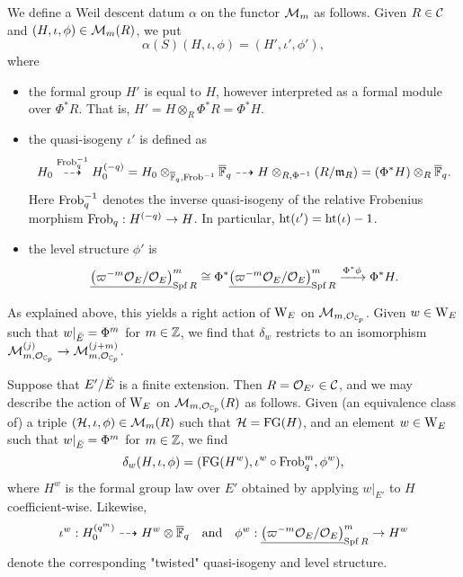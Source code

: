 \documentclass[../main.tex]{subfiles}
\begin{document}
We define a Weil descent datum $\alpha$ on the functor $\mathcal{M}_m$ as follows. 
Given $R\in \mathcal{C}$ and $(H, \iota, \phi) \in \mathcal{M}_m(R)$, we put
\begin{equation*}
  \alpha(S) \left( H, \iota, \phi \right) = (H', \iota',\phi'),
\end{equation*}
where
\begin{itemize}
  \item the formal group $H'$ is equal to $H$, however interpreted as a formal
    module over $\Phi^*R$. That is, $H' = H \otimes_{R} \Phi^* R = \Phi^* H$.
  \item the quasi-isogeny $\iota'$ is defined as
    \begin{equation*}
      H_0 \overset{\mathrm{Frob}_q^{-1}}{\dashrightarrow} H_0^{(-q)} = H_0
      \otimes_{\overline {\mathbb{F}}_q, \mathrm{Frob}^{-1}}
      \overline {\mathbb{F}}_q \dashrightarrow H \otimes_{R, \Phi^{-1}} (R/\mathfrak{m}_R) = (\Phi^*
      H) \otimes_R \overline {\mathbb{F}}_q.
    \end{equation*}
    Here $\mathrm{Frob}_q^{-1}$ denotes the inverse quasi-isogeny of the relative
    Frobenius morphism $\mathrm{Frob}_q: H^{(-q)} \to H$. In particular, 
    $\textnormal{ht}(\iota') = \textnormal{ht}(\iota)-1$.
  \item the level structure $\phi'$ is
    \begin{equation*}
      \underline{\left({\varpi^{-m}\mathcal{O}_E}/{\mathcal{O}_E} \right)}^m_{\operatorname{Spf} R}
      \cong \Phi^* \underline{\left({\varpi^{-m}\mathcal{O}_E}/{\mathcal{O}_E} \right)}^m_{\operatorname{Spf} R}
      \xrightarrow{\Phi^* \phi} \Phi^* H.
    \end{equation*}
\end{itemize}

As explained above, this yields a right action of $\mathrm W_E$ on $\mathcal{M}_{m, \mathcal{O}_{\mathbb{C}_p}}$.
Given $w \in \mathrm W_E$ such that $w|_{\breve {E}} = \Phi^m$ for $m \in \mathbb{Z}$, we find
that $\delta_w$ restricts to an isomorphism $\mathcal{M}_{m, \mathcal{O}_{\mathbb{C}_p}}^{(j)} \to \mathcal{M}_{m,
\mathcal{O}_{\mathbb{C}_p}}^{(j+m)}$. 

\begin{xpl}
  Suppose that $E'/{\breve {E}}$ is a finite extension. Then $R = \mathcal{O}_{E'} \in \mathcal{C}$, 
  and we may describe the action of $\mathrm W_E$ on 
  $\mathcal{M}_{m, \mathcal{O}_{\mathbb{C}_p}}(R)$ as follows. Given (an equivalence class of)
  a triple $(\mathcal{H}, \iota, \phi) \in \mathcal{M}_m(R)$ such that 
  $\mathcal{H} = \textnormal{FG}(H)$, and an element $w \in \mathrm W_E$ such that 
  $w|_{{\breve {E}}} = \Phi^m$ for $m \in \mathbb{Z}$, we find 
  $$\delta_w(H, \iota, \phi) = (\textnormal{FG}(H^w), \iota^w \circ \mathrm{Frob}_q^m, \phi^w),$$ 
  where $H^w$ is the formal group law over $E'$ obtained by applying 
  $w|_{E'}$ to $H$ coefficient-wise. Likewise, 
  $$\iota^w: H_0^{(q^m)} \dashrightarrow H^w \otimes \overline {\mathbb{F}}_q
  \quad \text{and} \quad
  \phi^w:  \underline{\left({\varpi^{-m}\mathcal{O}_E}/{\mathcal{O}_E} \right)}^m_{\operatorname{Spf} R}
      \to H^w$$
  denote the corresponding "twisted" quasi-isogeny and level structure.
\end{xpl}
\end{document}
